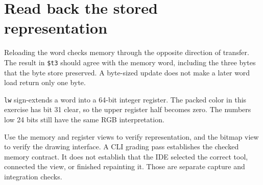 \section{Read back the stored
  representation}\label{002-single-pixel-p07-read-back-the-stored-representation}

Reloading the word checks memory through the opposite direction of
transfer. The result in \texttt{\$t3} should agree with the memory word,
including the three bytes that the byte store preserved. A byte-sized
update does not make a later word load return only one byte.

\texttt{lw} sign-extends a word into a 64-bit integer register. The
packed color in this exercise has bit 31 clear, so the upper register
half becomes zero. The number\textquotesingle s low 24 bits still have
the same RGB interpretation.

Use the memory and register views to verify representation, and the
bitmap view to verify the drawing interface. A CLI grading pass
establishes the checked memory contract. It does not establish that the
IDE selected the correct tool, connected the view, or finished
repainting it. Those are separate capture and integration checks.
